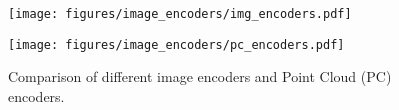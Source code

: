 
\begin{figure}
    \centering
    \begin{minipage}{0.23\textwidth}
        \texttt{[image: figures/image\_encoders/img\_encoders.pdf]}
        \label{fig:img_encoders}
        \vspace{-0.4cm}
    \end{minipage}
    \hfill
    \begin{minipage}{0.23\textwidth}
        \texttt{[image: figures/image\_encoders/pc\_encoders.pdf]}
        \label{fig:img_encoders}
        \vspace{-0.4cm}
    \end{minipage}
    \caption[]{Comparison of different image encoders and Point Cloud (PC) encoders.}
    \label{fig:image_encoders}
\end{figure}